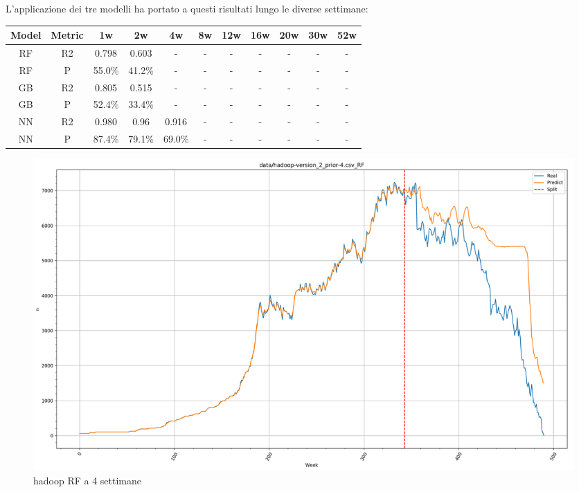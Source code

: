\documentclass[%
    corpo=12pt,
    twoside,
    oldstyle,
    autoretitolo,
    greek,
    evenboxes,
]{toptesi}
\begin{document}
L'applicazione dei tre modelli ha portato a questi risultati lungo le diverse settimane:
\begin{center}
   \label{tab:single_scen_hadoop}
  \begin{tabular}{ |c|c|c|c|c|c|c|c|c|c|c| }
     \hline
     \textbf{Model} & \textbf{Metric} & \textbf{1w} & \textbf{2w} & \textbf{4w} & \textbf{8w} & \textbf{12w} & \textbf{16w} & \textbf{20w} & \textbf{30w}  & \textbf{52w} \\
     \hline
     \hline
     RF & R2 & 0.798 & 0.603 & - & - & - & - & - & - & -\\
     \hline
     RF & P & 55.0\% & 41.2\% & - & - & - & - & - & - & -\\
     \hline
     \hline
     GB & R2 & 0.805 & 0.515 & - & - & - & - & - & - & -\\
     \hline
     GB & P & 52.4\% & 33.4\% & - & - & - & - & - & - & -\\
     \hline
     \hline
     NN & R2 & 0.980 & 0.96 & 0.916 & - & - & - & - & - & -\\
     \hline
     NN & P & 87.4\% & 79.1\% & 69.0\% & - & - & - & - & - & -\\
     \hline
  \end{tabular}
\end{center}
\begin{figure}[!ht]
  \includegraphics[width=\linewidth]{figure/hadoop_rf_4w.png}
  \caption{hadoop RF a 4 settimane}
  \label{fig:hadoop_rf_4w}
\end{figure}
\end{document}
